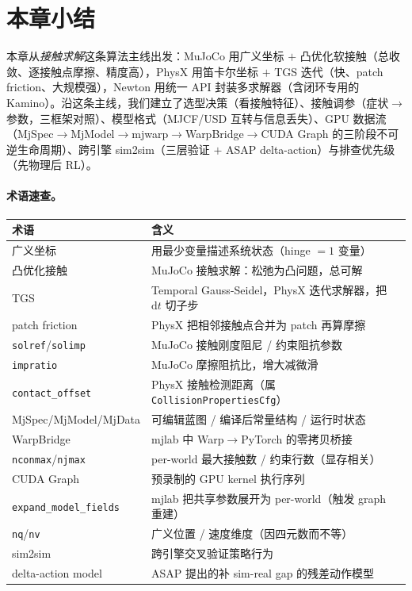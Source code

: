 \section*{本章小结}
\label{sec:rlmc-phys-summary}

本章从\emph{接触求解}这条算法主线出发：MuJoCo 用广义坐标 $+$ 凸优化软接触（总收敛、逐接触点摩擦、精度高），PhysX 用笛卡尔坐标 $+$ TGS 迭代（快、patch friction、大规模强），Newton 用统一 API 封装多求解器（含闭环专用的 Kamino）。沿这条主线，我们建立了选型决策（看接触特征）、接触调参（症状$\to$参数，三框架对照）、模型格式（MJCF/USD 互转与信息丢失）、GPU 数据流（MjSpec$\to$MjModel$\to$mjwarp$\to$WarpBridge$\to$CUDA Graph 的三阶段不可逆生命周期）、跨引擎 sim2sim（三层验证 $+$ ASAP delta-action）与排查优先级（先物理后 RL）。

\paragraph{术语速查。}

\begin{center}
\small
\begin{tabular}{@{}lp{8.6cm}@{}}
\toprule
术语 & 含义 \\
\midrule
广义坐标 & 用最少变量描述系统状态（hinge $=1$ 变量） \\
凸优化接触 & MuJoCo 接触求解：松弛为凸问题，总可解 \\
TGS & Temporal Gauss-Seidel，PhysX 迭代求解器，把 $\mathrm dt$ 切子步 \\
patch friction & PhysX 把相邻接触点合并为 patch 再算摩擦 \\
\verb|solref|/\verb|solimp| & MuJoCo 接触刚度阻尼 / 约束阻抗参数 \\
\verb|impratio| & MuJoCo 摩擦阻抗比，增大减微滑 \\
\verb|contact_offset| & PhysX 接触检测距离（属 \verb|CollisionPropertiesCfg|） \\
MjSpec/MjModel/MjData & 可编辑蓝图 / 编译后常量结构 / 运行时状态 \\
WarpBridge & mjlab 中 Warp$\to$PyTorch 的零拷贝桥接 \\
\verb|nconmax|/\verb|njmax| & per-world 最大接触数 / 约束行数（显存相关） \\
CUDA Graph & 预录制的 GPU kernel 执行序列 \\
\verb|expand_model_fields| & mjlab 把共享参数展开为 per-world（触发 graph 重建） \\
\verb|nq|/\verb|nv| & 广义位置 / 速度维度（因四元数而不等） \\
sim2sim & 跨引擎交叉验证策略行为 \\
delta-action model & ASAP 提出的补 sim-real gap 的残差动作模型 \\
\bottomrule
\end{tabular}
\end{center}

